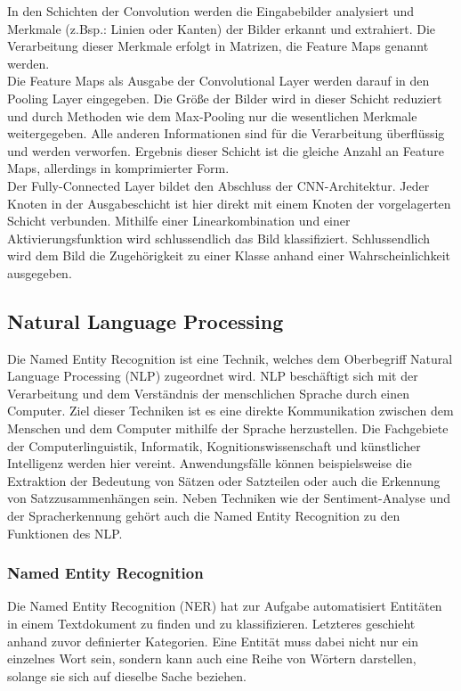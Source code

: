 In den Schichten der Convolution werden die Eingabebilder analysiert und Merkmale (z.Bsp.: Linien oder Kanten) der Bilder erkannt und extrahiert.
Die Verarbeitung dieser Merkmale erfolgt in Matrizen, die Feature Maps genannt werden. \\
Die Feature Maps als Ausgabe der Convolutional Layer werden darauf in den Pooling Layer eingegeben.
Die Größe der Bilder wird in dieser Schicht reduziert und durch Methoden wie dem Max-Pooling nur die wesentlichen Merkmale weitergegeben.
Alle anderen Informationen sind für die Verarbeitung überflüssig und werden verworfen.  Ergebnis dieser Schicht ist die gleiche Anzahl an Feature Maps, allerdings in komprimierter Form. \\
Der Fully-Connected Layer bildet den Abschluss der CNN-Architektur. Jeder Knoten in der Ausgabeschicht ist hier direkt mit einem Knoten der vorgelagerten Schicht verbunden.
Mithilfe einer Linearkombination und einer Aktivierungsfunktion wird schlussendlich das Bild klassifiziert. Schlussendlich wird dem Bild die Zugehörigkeit zu einer Klasse anhand einer Wahrscheinlichkeit ausgegeben.

\subsection{Natural Language Processing}
Die Named Entity Recognition ist eine Technik, welches dem Oberbegriff Natural Language Processing (NLP) zugeordnet wird. NLP beschäftigt sich mit der Verarbeitung und dem Verständnis der menschlichen Sprache durch einen Computer.
Ziel dieser Techniken ist es eine direkte Kommunikation zwischen dem Menschen und dem Computer mithilfe der Sprache herzustellen. Die Fachgebiete der Computerlinguistik, Informatik, Kognitionswissenschaft und künstlicher Intelligenz werden hier vereint.
Anwendungsfälle können beispielsweise die Extraktion der Bedeutung von Sätzen oder Satzteilen oder auch die Erkennung von Satzzusammenhängen sein.   Neben Techniken wie der Sentiment-Analyse und der Spracherkennung gehört auch die Named Entity Recognition zu den Funktionen des NLP.

\subsubsection{Named Entity Recognition}
Die Named Entity Recognition (NER) hat zur Aufgabe automatisiert Entitäten in einem Textdokument zu finden und zu klassifizieren. Letzteres geschieht anhand zuvor definierter Kategorien.
Eine Entität muss dabei nicht nur ein einzelnes Wort sein, sondern kann auch eine Reihe von Wörtern darstellen, solange sie sich auf dieselbe Sache beziehen.

